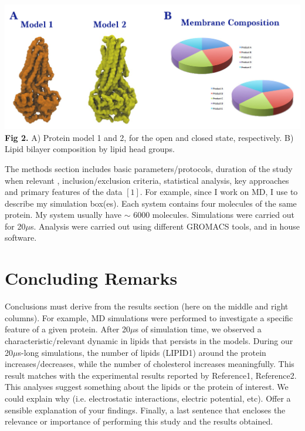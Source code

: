 \documentclass[a0,final,landscape]{a0poster}
\begin{document}
\begin{minipage}[c][30cm][c]{0.32\textwidth}
\begin{center}
\includegraphics[scale=2.5]{img/pies-1.png}\\
\vspace{-0.2cm}
\small{\textbf{Fig 2.} A) Protein model 1 and 2, for the open and closed state, respectively. B) Lipid bilayer composition by lipid head groups.}
\end{center}
\large
The methods section includes basic parameters/protocols, duration of the study when relevant , inclusion/exclusion criteria, statistical analysis, key approaches and primary features of the data $[1]$. For example, since I work on MD, I use to describe my simulation box(es). Each system contains four molecules of the same protein. My system usually have $\sim$ 6000 molecules. Simulations were carried out for 20$\mu$s. Analysis were carried out using different GROMACS tools, and in house software.


\vspace{-0.5cm}
\section*{\textcolor{blue1}{\Huge \bf{Concluding Remarks}}} 
\vspace{-0.8cm}
\large
Conclusions must derive from the results section (here on the middle and right columns). For example, MD simulations were performed to investigate a specific feature of a given protein. After 20$\mu$s of simulation time, we observed a characteristic/relevant dynamic in lipids that persists in the models. During our 20$\mu$s-long simulations, the number of lipids (LIPID1) around the protein increases/decreases, while the number of cholesterol increases meaningfully. This result matches with the experimental results reported by Reference1, Reference2. This analyses suggest something about the lipids or the protein of interest. We could explain why (i.e. electrostatic interactions, electric potential, etc). Offer a sensible explanation of your findings. Finally, a last sentence that encloses the relevance or importance of performing this study and the results obtained.  

\end{minipage}
\end{document}
